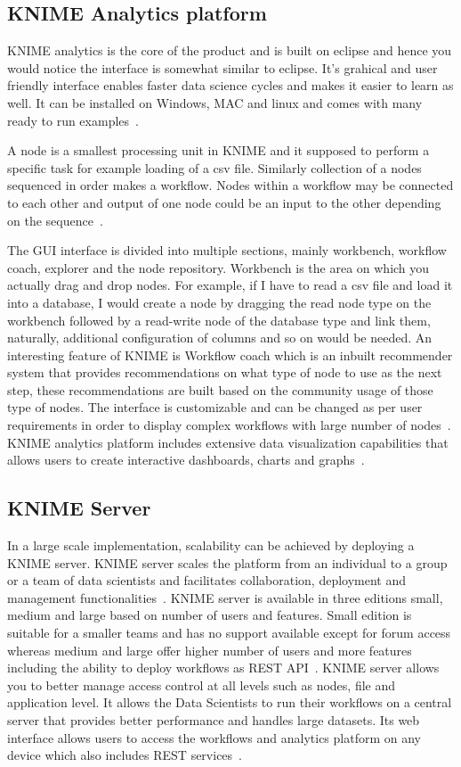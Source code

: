 \subsection{KNIME Analytics platform}
KNIME analytics is the core of the product and is built on eclipse and
hence you would notice the interface is somewhat similar to
eclipse. It's grahical and user friendly interface enables faster data
science cycles and makes it easier to learn as well. It can be
installed on Windows, MAC and linux and comes with many ready to run
examples~\cite{hid-sp18-517-kap}.

A node is a smallest processing unit in KNIME and it supposed to
perform a specific task for example loading of a csv file. Similarly
collection of a nodes sequenced in order makes a workflow. Nodes
within a workflow may be connected to each other and output of one
node could be an input to the other depending on the
sequence~\cite{hid-sp18-517-kintro}.

The GUI interface is divided into multiple sections, mainly workbench,
workflow coach, explorer and the node repository. Workbench is the
area on which you actually drag and drop nodes. For example, if I have
to read a csv file and load it into a database, I would create a node
by dragging the read node type on the workbench followed by a
read-write node of the database type and link them, naturally,
additional configuration of columns and so on would be needed.  An
interesting feature of KNIME is Workflow coach which is an inbuilt
recommender system that provides recommendations on what type of node
to use as the next step, these recommendations are built based on the
community usage of those type of nodes. The interface is customizable 
and can be changed as per user requirements in order to display complex 
workflows with large number of nodes~\cite{hid-sp18-517-ch1sec1}.
KNIME analytics platform includes extensive data visualization
capabilities that allows users to create interactive dashboards,
charts and graphs~\cite{hid-sp18-517-ch5}.

\subsection{KNIME Server}
In a large scale implementation, scalability can be achieved by
deploying a KNIME server. KNIME server scales the platform from an
individual to a group or a team of data scientists and facilitates
collaboration, deployment and management
functionalities~\cite{hid-sp18-517-server}. KNIME server is available
in three editions small, medium and large based on number of users and
features. Small edition is suitable for a smaller teams and has no
support available except for forum access whereas medium and large
offer higher number of users and more features including the ability
to deploy workflows as REST API~\cite{hid-sp18-517-editions}.  KNIME
server allows you to better manage access control at all levels such
as nodes, file and application level. It allows the Data Scientists to
run their workflows on a central server that provides better
performance and handles large datasets. Its web interface allows users
to access the workflows and analytics platform on any device which
also includes REST services~\cite{hid-sp18-517-editions}.


